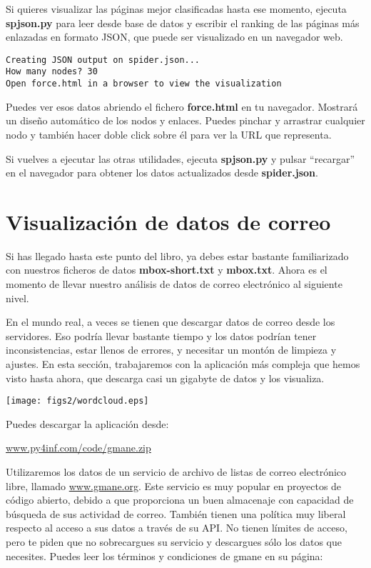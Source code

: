 Si quieres visualizar las páginas mejor clasificadas hasta ese momento,
ejecuta {\bf spjson.py} para leer desde base de datos y escribir el ranking de
las páginas más enlazadas en formato JSON, que puede ser visualizado en
un navegador web.

\beforeverb
\begin{verbatim}
Creating JSON output on spider.json...
How many nodes? 30
Open force.html in a browser to view the visualization
\end{verbatim}
\afterverb
%
Puedes ver esos datos abriendo el fichero {\bf force.html} en tu navegador.
Mostrará un diseño automático de los nodos y enlaces. Puedes pinchar y
arrastrar cualquier nodo y también hacer doble click sobre él para ver la URL
que representa.

Si vuelves a ejecutar las otras utilidades, ejecuta {\bf spjson.py} y
pulsar ``recargar'' en el navegador para obtener los datos actualizados desde {\bf spider.json}.

\section{Visualización de datos de correo}

Si has llegado hasta este punto del libro, ya debes estar bastante familiarizado con
nuestros ficheros de datos {\bf mbox-short.txt} y {\bf mbox.txt}. Ahora es el momento
de llevar nuestro análisis de datos de correo electrónico al siguiente nivel.

En el mundo real, a veces se tienen que descargar datos de correo desde los servidores.
Eso podría llevar bastante tiempo y los datos podrían tener inconsistencias,
estar llenos de errores, y necesitar un montón de limpieza y ajustes. En esta sección,
trabajaremos con la aplicación más compleja que hemos visto hasta ahora, que
descarga casi un gigabyte de datos y los visualiza.

\beforefig
\centerline{\texttt{[image: figs2/wordcloud.eps]}}
\afterfig

Puedes descargar la aplicación desde:

\url{www.py4inf.com/code/gmane.zip}

Utilizaremos los datos de un servicio de archivo de listas de correo electrónico libre,
llamado \url{www.gmane.org}. Este servicio es muy popular en proyectos de código abierto,
debido a que proporciona un buen almacenaje con capacidad de búsqueda de sus
actividad de correo. También tienen una política muy liberal respecto al acceso a
sus datos a través de su API. No tienen límites de acceso, pero te piden que no
sobrecargues su servicio y descargues sólo los datos que necesites. Puedes leer
los términos y condiciones de gmane en su página:

